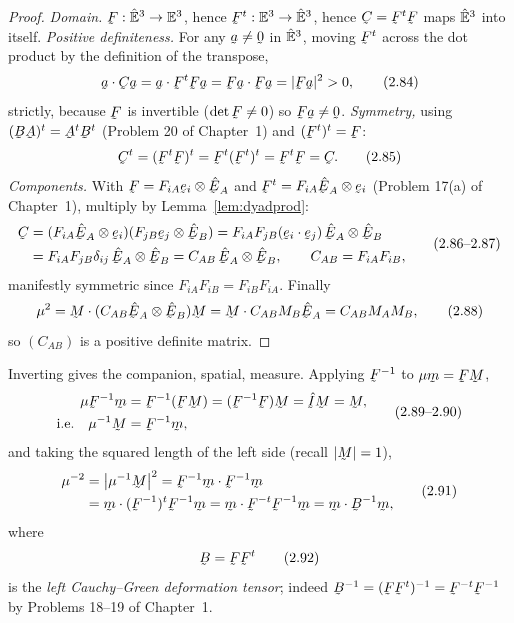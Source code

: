 \begin{proof}
\emph{Domain.} $\bF:\hVt\to\Vt$, hence $\bF^{t}:\Vt\to\hVt$, hence
$\bC=\bF^{t}\bF$ maps $\hat{\mathbb{E}}^{3}$ into itself.
\emph{Positive definiteness.} For any $\ba\neq\bze$ in $\hat{\mathbb{E}}^{3}$, moving $\bF^t$
across the dot product by the definition of the transpose,
\begin{equation}
   \ip\ba{\bC\ba}=\ip\ba{\bF^{t}\bF\ba}=\ip{\bF\ba}{\bF\ba}=|\bF\ba|^{2}>0,
   \tag{2.84}\label{eq:2.84}
\end{equation}
strictly, because $\bF$ is invertible ($\det\bF\neq0$) so $\bF\ba\neq\bze$.
\emph{Symmetry,} using $(\bB\bA)^{t}=\bA^{t}\bB^{t}$ (Problem 20 of
Chapter~1) and $(\bF^{t})^{t}=\bF$:
\begin{equation}
   \bC^{t}=(\bF^{t}\bF)^{t}=\bF^{t}(\bF^{t})^{t}=\bF^{t}\bF=\bC. \tag{2.85}\label{eq:2.85}
\end{equation}
\emph{Components.} With $\bF=F_{iA}\be_i\otimes\hbE_A$ and
$\bF^{t}=F_{iA}\hbE_A\otimes\be_i$ (Problem 17(a) of Chapter~1), multiply by
Lemma~\ref{lem:dyadprod}:
\begin{equation}
\begin{aligned}
   \bC&=(F_{iA}\hbE_A\otimes\be_i)(F_{jB}\be_j\otimes\hbE_B)
   =F_{iA}F_{jB}(\ip{\be_i}{\be_j})\,\hbE_A\otimes\hbE_B\\
   &=F_{iA}F_{jB}\dd_{ij}\,\hbE_A\otimes\hbE_B
   =C_{AB}\,\hbE_A\otimes\hbE_B,\qquad C_{AB}=F_{iA}F_{iB},
\end{aligned}\tag{2.86--2.87}
\end{equation}
manifestly symmetric since $F_{iA}F_{iB}=F_{iB}F_{iA}$. Finally
\begin{equation}
   \mu^{2}=\ip\bM{(C_{AB}\hbE_A\otimes\hbE_B)\bM}
   =\ip\bM{C_{AB}M_B\hbE_A}=C_{AB}M_AM_B, \tag{2.88}
\end{equation}
so $(C_{AB})$ is a positive definite matrix.
\end{proof}

Inverting  gives the companion, spatial, measure. Applying $\bF^{-1}$
to $\mu\bmm=\bF\bM$,
\begin{equation}
\begin{aligned}
   \mu\bF^{-1}\bmm&=\bF^{-1}(\bF\bM)=(\bF^{-1}\bF)\bM=\hat\I\bM=\bM,\\
   \text{i.e.}\quad \mu^{-1}\bM&=\bF^{-1}\bmm,
\end{aligned}
\tag{2.89--2.90}\label{eq:2.89}
\end{equation}
and taking the squared length of the left side (recall $|\bM|=1$),
\begin{equation}
\begin{aligned}
   \mu^{-2}&=\big|\mu^{-1}\bM\big|^{2}=\ip{\bF^{-1}\bmm}{\bF^{-1}\bmm}\\
   &=\ip\bmm{(\bF^{-1})^{t}\bF^{-1}\bmm}
   =\ip\bmm{\bF^{-t}\bF^{-1}\bmm}=\ip\bmm{\bB^{-1}\bmm},
\end{aligned}
\tag{2.91}\label{eq:2.91}
\end{equation}
where
\begin{equation}
   \bB=\bF\bF^{t} \tag{2.92}\label{eq:2.92}
\end{equation}
is the \emph{left Cauchy--Green deformation tensor}; indeed
$\bB^{-1}=(\bF\bF^{t})^{-1}=\bF^{-t}\bF^{-1}$ by Problems 18--19 of
Chapter~1.

